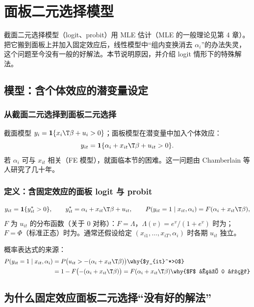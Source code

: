 \section{面板二元选择模型}\label{sec:U11b-binary}

截面二元选择模型（logit、probit）用 MLE 估计（MLE 的一般理论见第 4 章）。把它搬到面板上并加入固定效应后，线性模型中“组内变换消去 $\alpha_i$”的办法失灵，这个问题至今没有一般的好解法。本节说明原因，并介绍 logit 情形下的特殊解法。

\subsection{模型：含个体效应的潜变量设定}

\subsubsection{从截面二元选择到面板二元选择}

截面模型 $y_i=\mathbf{1}\{x_i\T\beta+u_i>0\}$；面板模型在潜变量中加入个体效应：
\[
y_{it}=\mathbf{1}\{\alpha_i+x_{it}\T\beta+u_{it}>0\}.
\]
若 $\alpha_i$ 可与 $x_{it}$ 相关（FE 模型），就面临本节的困难。这一问题由 Chamberlain 等人研究了几十年。

\subsubsection{定义：含固定效应的面板 logit 与 probit}

\begin{defn}[含固定效应的面板二元选择模型]\label{def:U11b-binary}
\[
y_{it}=\mathbf{1}\{y_{it}^*>0\},\qquad y_{it}^*=\alpha_i+x_{it}\T\beta+u_{it},\qquad P(y_{it}=1\mid x_{it},\alpha_i)=F(\alpha_i+x_{it}\T\beta),
\]
$F$ 为 $u_{it}$ 的分布函数（关于 0 对称）：$F=\Lambda$，$\Lambda(v)=e^v/(1+e^v)$ 时为；$F=\Phi$（标准正态）时为。通常还假设给定 $(x_{i1},\dots,x_{iT},\alpha_i)$ 时各期 $u_{it}$ 独立。
\end{defn}
概率表达式的来源：
\begin{align*}
P(y_{it}=1\mid x_{it},\alpha_i) &= P\bigl(u_{it}>-(\alpha_i+x_{it}\T\beta)\bigr) \why{$y_{it}^*>0$}\\
&= 1-F\bigl(-(\alpha_i+x_{it}\T\beta)\bigr)=F(\alpha_i+x_{it}\T\beta) \why{$F$ 关于 0 对称}
\end{align*}

\subsection{为什么固定效应面板二元选择“没有好的解法”}

